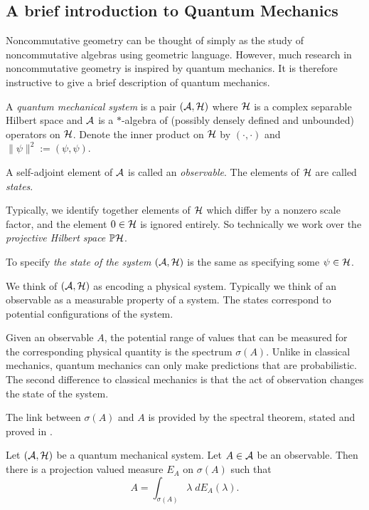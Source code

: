 \subsection{A brief introduction to Quantum Mechanics}
Noncommutative geometry can be thought of simply as the study of noncommutative
algebras using geometric language. However, much research in noncommutative
geometry is inspired by quantum mechanics. It is therefore instructive to 
give a brief description of quantum mechanics. 


\begin{definition}
    A \emph{quantum mechanical system} is a pair $(\mathcal{A},\mathcal{H})$ where $\mathcal{H}$
    is a complex separable Hilbert space and $\mathcal{A}$ is a $*$-algebra
    of (possibly densely defined and unbounded) operators on $\mathcal{H}$. 
    Denote the inner product on $\mathcal{H}$ by $(\cdot,\cdot)$
    and $\|\psi\|^2 := (\psi,\psi)$.
    
    
    A self-adjoint element of $\mathcal{A}$ is called an \emph{observable}. 
    The elements of $\mathcal{H}$ are called \emph{states}. 
    
    Typically, we identify together elements of $\mathcal{H}$
    which differ by a nonzero scale factor, and the element $0 \in \mathcal{H}$
    is ignored entirely. So technically we work over the \emph{projective
    Hilbert space} $\mathbb{P}\mathcal{H}$.
    
    To specify \emph{the state of the system} $(\mathcal{A},\mathcal{H})$ is the same
    as specifying some $\psi \in \mathcal{H}$.
\end{definition}

We think of $(\mathcal{A},\mathcal{H})$ as encoding a physical system. 
Typically we think of an observable as a measurable
property of a system. The states correspond to potential
configurations of the system.

Given an observable $A$, the potential range
of values that can be measured
for the corresponding physical quantity is the spectrum $\sigma(A)$. Unlike in classical mechanics,
quantum mechanics can only make predictions that are probabilistic.
The second difference to classical mechanics is that the act of observation changes
the state of the system.

The link
between $\sigma(A)$ and $A$ is provided by the spectral theorem, stated and proved in \cite[p.369]{rudin}.
\begin{theorem}
    Let $(\mathcal{A},\mathcal{H})$ be a quantum mechanical system. Let $A \in \mathcal{A}$ be an observable.
    Then there is a projection valued measure $E_A$ on $\sigma(A)$ such that
    \begin{equation*}
        A = \int_{\sigma(A)} \lambda\;dE_A(\lambda).
    \end{equation*}
\end{theorem}


